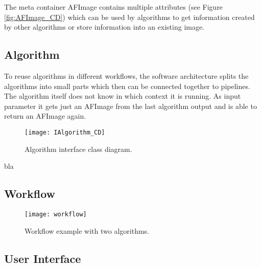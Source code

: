 The meta container AFImage contains multiple attributes (see Figure \ref{fig:AFImage_CD}) which can be used by algorithms to get information created by other algorithms or store information into an existing image.

\subsection{Algorithm}
To reuse algorithms in different workflows, the software architecture splits the algorithms into small parts which then can be connected together to pipelines. The algorithm itself does not know in which context it is running. As input parameter it gets just an AFImage from the last algorithm output and is able to return an AFImage again. 

\begin{figure}[h]
  \centering
      \texttt{[image: IAlgorithm\_CD]}
  \caption{Algorithm interface class diagram.}
  \label{fig:IAlgorithm_CD}
\end{figure}

bla

\subsection{Workflow}

\begin{figure}[h]
  \centering
      \texttt{[image: workflow]}
  \caption{Workflow example with two algorithms.}
  \label{fig:Workflow}
\end{figure}

\subsection{User Interface}

